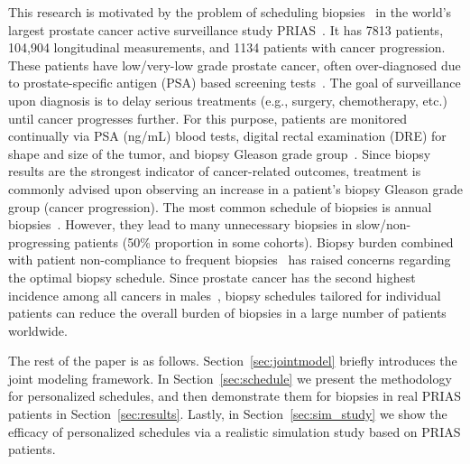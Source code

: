 This research is motivated by the problem of scheduling biopsies~\citep{nieboer2018active} in the world's largest prostate cancer active surveillance study PRIAS~\citep{bokhorst2015compliance}. It has 7813 patients, 104,904 longitudinal measurements, and 1134 patients with cancer progression. These patients have low/very-low grade prostate cancer, often over-diagnosed due to prostate-specific antigen (PSA) based screening tests~\citep{crawford2003epidemiology}. The goal of surveillance upon diagnosis is to delay serious treatments (e.g., surgery, chemotherapy, etc.) until cancer progresses further. For this purpose, patients are monitored continually via PSA (ng/mL) blood tests, digital rectal examination (DRE) for shape and size of the tumor, and biopsy Gleason grade group~\citep{epsteinGG2014}. Since biopsy results are the strongest indicator of cancer-related outcomes, treatment is commonly advised upon observing an increase in a patient's biopsy Gleason grade group (cancer progression). The most common schedule of biopsies is annual biopsies~\citep{loeb2014heterogeneity}. However, they lead to many unnecessary biopsies in slow/non-progressing patients (50\% proportion in some cohorts). Biopsy burden combined with patient non-compliance to frequent biopsies~\citep{bokhorst2015compliance} has raised concerns regarding the optimal biopsy schedule. Since prostate cancer has the second highest incidence among all cancers in males~\citep{GlobalCancerStats2012}, biopsy schedules tailored for individual patients can reduce the overall burden of biopsies in a large number of patients worldwide.

The rest of the paper is as follows. Section~\ref{sec:jointmodel} briefly introduces the joint modeling framework. In Section~\ref{sec:schedule} we present the methodology for personalized schedules, and then demonstrate them for biopsies in real PRIAS patients in Section~\ref{sec:results}. Lastly, in Section~\ref{sec:sim_study} we show the efficacy of personalized schedules via a realistic simulation study based on PRIAS patients.